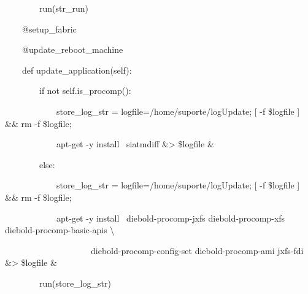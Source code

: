     \bigskip

{\ttfamily\color[rgb]{0.10980392,0.10980392,0.10980392}
    \ \ \ \ \ \ \ \ run(str\_run)}


    \bigskip

{\ttfamily\color[rgb]{0.10980392,0.10980392,0.10980392}
    \ \ \ \ @setup\_fabric}

{\ttfamily\color[rgb]{0.10980392,0.10980392,0.10980392}
    \ \ \ \ @update\_reboot\_machine}

{\ttfamily\color[rgb]{0.10980392,0.10980392,0.10980392}
    \ \ \ \ def update\_application(self):}

{\ttfamily\color[rgb]{0.10980392,0.10980392,0.10980392}
    \ \ \ \ \ \ \ \ if not self.is\_procomp():}

{\ttfamily\color[rgb]{0.10980392,0.10980392,0.10980392}
    \ \ \ \ \ \ \ \ \ \ \ \ store\_log\_str = {\textquotedbl}{\textquotedbl}{\textquotedbl}logfile=/home/suporte/logUpdate;
    [ -f {\textquotedbl}\$logfile{\textquotedbl} ] \&\& rm -f {\textquotedbl}\$logfile{\textquotedbl};}

{\ttfamily\color[rgb]{0.10980392,0.10980392,0.10980392}
    \ \ \ \ \ \ \ \ \ \ \ \ apt-get -y install \ siatmdiff \&{\textgreater} {\textquotedbl}\$logfile{\textquotedbl}
    \&{\textquotedbl}{\textquotedbl}{\textquotedbl}}

{\ttfamily\color[rgb]{0.10980392,0.10980392,0.10980392}
    \ \ \ \ \ \ \ \ else:}

{\ttfamily\color[rgb]{0.10980392,0.10980392,0.10980392}
    \ \ \ \ \ \ \ \ \ \ \ \ store\_log\_str = {\textquotedbl}{\textquotedbl}{\textquotedbl}logfile=/home/suporte/logUpdate;
    [ -f {\textquotedbl}\$logfile{\textquotedbl} ] \&\& rm -f {\textquotedbl}\$logfile{\textquotedbl};}

{\ttfamily\color[rgb]{0.10980392,0.10980392,0.10980392}
    \ \ \ \ \ \ \ \ \ \ \ \ apt-get -y install \ diebold-procomp-jxfs diebold-procomp-xfs diebold-procomp-basic-apis
    {\textbackslash}}

{\ttfamily\color[rgb]{0.10980392,0.10980392,0.10980392}
    \ \ \ \ \ \ \ \ \ \ \ \ \ \ \ \ \ \ \ \ diebold-procomp-config-set diebold-procomp-ami jxfs-fdi \&{\textgreater}
    {\textquotedbl}\$logfile{\textquotedbl} \&{\textquotedbl}{\textquotedbl}{\textquotedbl}}


    \bigskip

{\ttfamily\color[rgb]{0.10980392,0.10980392,0.10980392}
    \ \ \ \ \ \ \ \ run(store\_log\_str)}


    \bigskip

